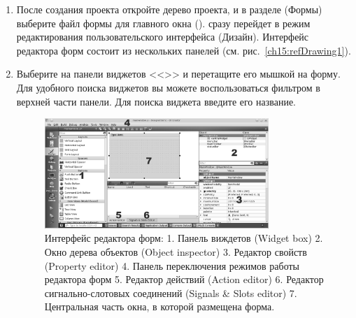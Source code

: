 \begin{enumerate}
\item После создания проекта откройте дерево проекта, и в разделе (Формы) выберите файл формы для главного окна
().  сразу перейдет в режим редактирования пользовательского интерфейса
(Дизайн). Интерфейс редактора форм состоит из нескольких панелей (см. рис.~\ref{ch15:refDrawing1}).
\item Выберите на панели виджетов <<>> и перетащите его мышкой на
форму. Для удобного поиска виджетов вы можете воспользоваться фильтром в верхней части панели. Для поиска виджета
введите его название.
\begin{figure}[htb]
\begin{center}
\includegraphics[width=0.8\textwidth]{img/ris_15_2}
\caption[Интерфейс редактора форм.]{Интерфейс редактора форм: 1. Панель виждетов (Widget box) 2. Окно дерева объектов (Object inspector)
3. Редактор свойств (Property editor) 4. Панель переключения режимов работы редактора форм 5. Редактор действий (Action
editor) 6. Редактор сигнально-слотовых соединений (Signals \& Slots editor) 7. Центральная часть окна, в которой
размещена форма.}
\label{ch14:refDrawing0}
\end{center}
\end{figure}


\end{enumerate}
